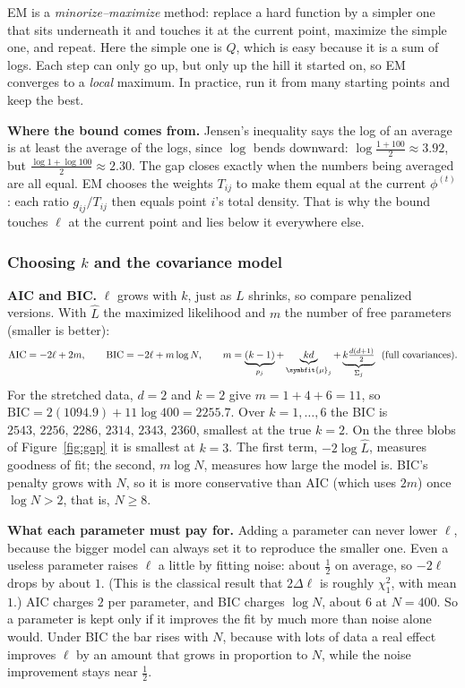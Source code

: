 \documentclass[11pt]{article}
\newcommand{\bm}[1]{\symbfit{#1}}
\begin{document}
\begin{intuition}
EM is a \emph{minorize--maximize} method: replace a hard function by a simpler one that sits underneath it and touches it at the current point, maximize the simple one, and repeat. Here the simple one is $Q$, which is easy because it is a sum of logs. Each step can only go up, but only up the hill it started on, so EM converges to a \emph{local} maximum. In practice, run it from many starting points and keep the best.

\textbf{Where the bound comes from.} Jensen's inequality says the log of an average is at least the average of the logs, since $\log$ bends downward: $\log\frac{1+100}2\approx3.92$, but $\frac{\log1+\log100}2\approx2.30$. The gap closes exactly when the numbers being averaged are all equal. EM chooses the weights $T_{ij}$ to make them equal at the current $\phi^{(t)}$: each ratio $g_{ij}/T_{ij}$ then equals point $i$'s total density. That is why the bound touches $\ell$ at the current point and lies below it everywhere else.
\end{intuition}

\subsubsection{Choosing $k$ and the covariance model}

\textbf{AIC and BIC.} $\ell$ grows with $k$, just as $L$ shrinks, so compare penalized versions. With $\widehat L$ the maximized likelihood and $m$ the number of free parameters (smaller is better):
\[
\mathrm{AIC}=-2\ell+2m,\qquad \mathrm{BIC}=-2\ell+m\log N,\qquad m=\underbrace{(k-1)}_{p_j}+\underbrace{kd}_{\bm\mu_j}+\underbrace{k\tfrac{d(d+1)}2}_{\Sigma_j}\ \ (\text{full covariances}).
\]
For the stretched data, $d=2$ and $k=2$ give $m=1+4+6=11$, so $\mathrm{BIC}=2(1094.9)+11\log400=2255.7$. Over $k=1,\dots,6$ the BIC is $2543,\,2256,\,2286,\,2314,\,2343,\,2360$, smallest at the true $k=2$. On the three blobs of Figure~\ref{fig:gap} it is smallest at $k=3$. The first term, $-2\log\widehat L$, measures goodness of fit; the second, $m\log N$, measures how large the model is. BIC's penalty grows with $N$, so it is more conservative than AIC (which uses $2m$) once $\log N>2$, that is, $N\ge8$.

\begin{intuition}
\textbf{What each parameter must pay for.} Adding a parameter can never lower $\ell$, because the bigger model can always set it to reproduce the smaller one. Even a useless parameter raises $\ell$ a little by fitting noise: about $\tfrac12$ on average, so $-2\ell$ drops by about $1$. (This is the classical result that $2\Delta\ell$ is roughly $\chi^2_1$, with mean $1$.) AIC charges $2$ per parameter, and BIC charges $\log N$, about $6$ at $N=400$. So a parameter is kept only if it improves the fit by much more than noise alone would. Under BIC the bar rises with $N$, because with lots of data a real effect improves $\ell$ by an amount that grows in proportion to $N$, while the noise improvement stays near $\tfrac12$.
\end{intuition}
\end{document}
